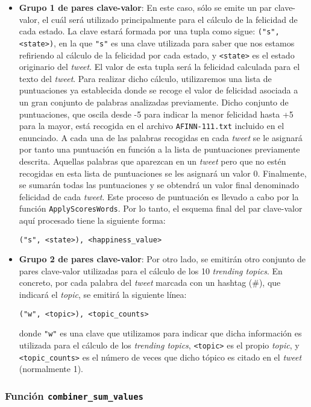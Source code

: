 \documentclass[10pt, spanish]{article}
\begin{document}
\begin{itemize}
\item \textbf{Grupo 1 de pares clave-valor}: En este caso, sólo se emite un par clave-valor, el cuál será utilizado principalmente para el cálculo de la felicidad de cada estado. La clave estará formada por una tupla como sigue: \texttt{("s", <state>)}, en la que \texttt{"s"} es una clave utilizada para saber que nos estamos refiriendo al cálculo de la felicidad por cada estado, y \texttt{<state>} es el estado originario del \textit{tweet}. El valor de esta tupla será la felicidad calculada para el texto del \textit{tweet}. Para realizar dicho cálculo, utilizaremos una lista de puntuaciones ya establecida donde se recoge el valor de felicidad asociada a un gran conjunto de palabras analizadas previamente. Dicho conjunto de puntuaciones, que oscila desde -5 para indicar la menor felicidad hasta +5 para la mayor, está recogida en el archivo \texttt{AFINN-111.txt} incluido en el enunciado. A cada una de las palabras recogidas en cada \textit{tweet} se le asignará por tanto una puntuación en función a la lista de puntuaciones previamente descrita. Aquellas palabras que aparezcan en un \textit{tweet} pero que no estén recogidas en esta lista de puntuaciones se les asignará un valor 0. Finalmente, se sumarán todas las puntuaciones y se obtendrá un valor final denominado felicidad de cada \textit{tweet}. Este proceso de puntuación es llevado a cabo por la función \texttt{ApplyScoresWords}. Por lo tanto, el esquema final del par clave-valor aquí procesado tiene la siguiente forma:

\texttt{("s", <state>), <happiness\_value>}

\item \textbf{Grupo 2 de pares clave-valor}: Por otro lado, se emitirán otro conjunto de pares clave-valor utilizadas para el cálculo de los 10 \textit{trending topics}. En concreto, por cada palabra del \textit{tweet} marcada con un hashtag (\#), que indicará el \textit{topic}, se emitirá la siguiente línea:

\texttt{("w", <topic>), <topic\_counts>}

donde \texttt{"w"} es una clave que utilizamos para indicar que dicha información es utilizada para el cálculo de los \textit{trending topics}, \texttt{<topic>} es el propio \textit{topic}, y \texttt{<topic\_counts>} es el número de veces que dicho tópico es citado en el \textit{tweet} (normalmente 1).
\end{itemize}

\subsubsection{Función \texttt{combiner\_sum\_values}}
\end{document}
